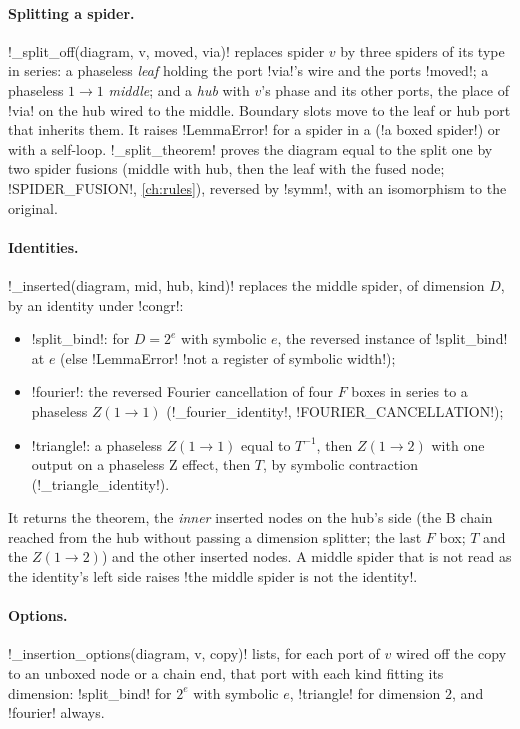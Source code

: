 \paragraph{Splitting a spider.} \py!_split_off(diagram, v, moved, via)! replaces spider $v$ by three spiders of its type in series: a phaseless \emph{leaf} holding the port \py!via!'s wire and the ports \py!moved!; a phaseless $1\to1$ \emph{middle}; and a \emph{hub} with $v$'s phase and its other ports, the place of \py!via! on the hub wired to the middle. Boundary slots move to the leaf or hub port that inherits them. It raises \py!LemmaError! for a spider in a \bbox{} (\code!a boxed spider!) or with a self-loop. \py!_split_theorem! proves the diagram equal to the split one by two spider fusions (middle with hub, then the leaf with the fused node; \py!SPIDER_FUSION!, \cref{ch:rules}), reversed by \py!symm!, with an isomorphism to the original.

\paragraph{Identities.} \py!_inserted(diagram, mid, hub, kind)! replaces the middle spider, of dimension $D$, by an identity under \py!congr!:
\begin{itemize}
\item \code!split_bind!: for $D=2^e$ with symbolic $e$, the reversed instance of \code!split_bind! at $e$ (else \py!LemmaError! \code!not a register of symbolic width!);
\item \code!fourier!: the reversed Fourier cancellation of four $F$ boxes in series to a phaseless $Z(1\to1)$ (\py!_fourier_identity!, \py!FOURIER_CANCELLATION!);
\item \code!triangle!: a phaseless $Z(1\to1)$ equal to $T^{-1}$, then $Z(1\to2)$ with one output on a phaseless Z effect, then $T$, by symbolic contraction (\py!_triangle_identity!).
\end{itemize}
It returns the theorem, the \emph{inner} inserted nodes on the hub's side (the B chain reached from the hub without passing a dimension splitter; the last $F$ box; $T$ and the $Z(1\to2)$) and the other inserted nodes. A middle spider that is not read as the identity's left side raises \code!the middle spider is not the identity!.

\paragraph{Options.} \py!_insertion_options(diagram, v, copy)! lists, for each port of $v$ wired off the copy to an unboxed node or a chain end, that port with each kind fitting its dimension: \code!split_bind! for $2^e$ with symbolic $e$, \code!triangle! for dimension $2$, and \code!fourier! always.

